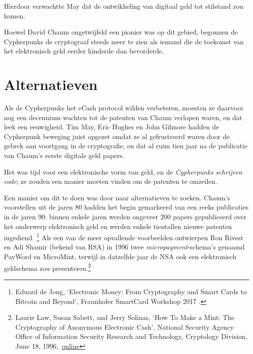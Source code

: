 \documentclass[smalldemyvopaper,11pt,twoside,onecolumn,openright,extrafontsizes,hidelinks]{memoir}
\begin{document}
Hierdoor verwachtte May dat de ontwikkeling van digitaal geld tot
stilstand zou komen.

Hoewel David Chaum ongetwijfeld een pionier was op dit gebied, begonnen
de Cypherpunks de cryptograaf steeds meer te zien als iemand die de
toekomst van het elektronisch geld eerder hinderde dan bevorderde.

\section{Alternatieven}\label{alternatieven}

Als de Cypherpunks het eCash protocol wilden verbeteren, moesten ze
daarvoor nog een decennium wachten tot de patenten van Chaum verlopen
waren, en dat leek een eeuwigheid. Tim May, Eric Hughes en John Gilmore
hadden de Cypherpunk beweging juist opgezet omdat ze al gefrustreerd
waren door de gebrek aan voortgang in de cryptografie, en dat al ruim
tien jaar na de publicatie van Chaum's eerste digitale geld papers.

Het was tijd voor een elektronische vorm van geld, en de
\emph{Cypherpunks schrijven code}; ze zouden een manier moeten vinden om
de patenten te omzeilen.

Een manier om dit te doen was door naar alternatieven te zoeken. Chaum's
voorstellen uit de jaren 80 hadden het begin gemarkeerd van een reeks
publicaties in de jaren 90: binnen enkele jaren werden ongeveer 200
papers gepubliceerd over het onderwerp elektronisch geld en werden
enkele tientallen nieuwe patenten ingediend. \footnote{Eduard de Jong,
  `Electronic Money: From Cryptography and Smart Cards to Bitcoin and
  Beyond', Fraunhofer SmartCard Workshop 2017 .} Als een van de meer
opvallende voorbeelden ontwierpen Ron Rivest en Adi Shamir (bekend van
RSA) in 1996 twee \emph{micropayment}-schema's genaamd PayWord en
MicroMint, terwijl in datzelfde jaar de NSA ook een elektronisch
geldschema zou presenteren.\footnote{Laurie Law, Susan Sabett, and Jerry
  Solinas, `How To Make a Mint: The Cryptography of Anonymous Electronic
  Cash', National Security Agency Office of Information Security
  Research and Technology, Cryptology Division, June 18,
  1996,~\href{https://groups.csail.mit.edu/mac/classes/6.805/articles/money/nsamint/nsamint.htm}{online}}
\end{document}
